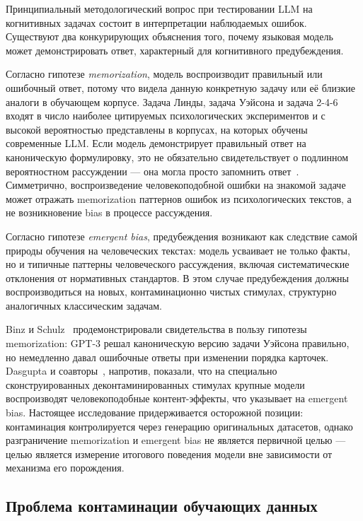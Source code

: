 Принципиальный методологический вопрос при тестировании LLM на когнитивных задачах состоит в интерпретации наблюдаемых ошибок. Существуют два конкурирующих объяснения того, почему языковая модель может демонстрировать ответ, характерный для когнитивного предубеждения.

Согласно гипотезе \textit{memorization}, модель воспроизводит правильный или ошибочный ответ, потому что видела данную конкретную задачу или её близкие аналоги в обучающем корпусе. Задача Линды, задача Уэйсона и задача 2-4-6 входят в число наиболее цитируемых психологических экспериментов и с высокой вероятностью представлены в корпусах, на которых обучены современные LLM. Если модель демонстрирует правильный ответ на каноническую формулировку, это не обязательно свидетельствует о подлинном вероятностном рассуждении --- она могла просто запомнить ответ~\cite{zhou2023benchmark}. Симметрично, воспроизведение человекоподобной ошибки на знакомой задаче может отражать memorization паттернов ошибок из психологических текстов, а не возникновение bias в процессе рассуждения.

Согласно гипотезе \textit{emergent bias}, предубеждения возникают как следствие самой природы обучения на человеческих текстах: модель усваивает не только факты, но и типичные паттерны человеческого рассуждения, включая систематические отклонения от нормативных стандартов. В этом случае предубеждения должны воспроизводиться на новых, контаминационно чистых стимулах, структурно аналогичных классическим задачам.

Binz и Schulz~\cite{binz2023using} продемонстрировали свидетельства в пользу гипотезы memorization: GPT-3 решал каноническую версию задачи Уэйсона правильно, но немедленно давал ошибочные ответы при изменении порядка карточек. Dasgupta и соавторы~\cite{dasgupta2024language}, напротив, показали, что на специально сконструированных деконтаминированных стимулах крупные модели воспроизводят человекоподобные контент-эффекты, что указывает на emergent bias. Настоящее исследование придерживается осторожной позиции: контаминация контролируется через генерацию оригинальных датасетов, однако разграничение memorization и emergent bias не является первичной целью --- целью является измерение итогового поведения модели вне зависимости от механизма его порождения.

\subsection{Проблема контаминации обучающих данных}

